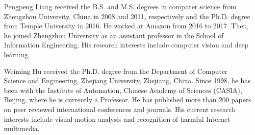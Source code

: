 \documentclass[journal]{IEEEtran}
\begin{document}
\begin{IEEEbiography}
{Pengpeng Liang}
received the B.S. and M.S. degrees in computer science from Zhengzhou University, China in 2008 and 2011, respectively and the Ph.D. degree from Temple University in 2016. He worked at Amazon from 2016 to 2017. Then, he joined Zhengzhou University as an assistant professor in the School of Information Engineering. His research interests include computer vision and deep learning.
\end{IEEEbiography}

\begin{IEEEbiography}
{Weiming Hu}
received the Ph.D. degree from the Department of Computer Science and Engineering, Zhejiang University, Zhejiang, China. Since 1998, he has been with the Institute of Automation, Chinese Academy of Sciences (CASIA), Beijing, where he is currently a Professor. He has published more than 200 papers on peer reviewed international conferences and journals. His current research interests include visual motion analysis and recognition of harmful Internet multimedia.
\end{IEEEbiography}
\end{document}
